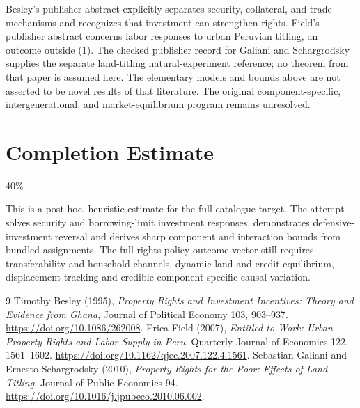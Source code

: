 \documentclass[11pt]{article}
\begin{document}
Besley's publisher abstract explicitly separates security, collateral,
and trade mechanisms and recognizes that investment can strengthen rights.
Field's publisher abstract concerns labor responses to urban Peruvian
titling, an outcome outside (1). The checked publisher record for Galiani
and Schargrodsky supplies the separate land-titling natural-experiment
reference; no theorem from that paper is assumed here. The elementary
models and bounds above are not asserted to be novel results of that
literature. The original component-specific, intergenerational, and
market-equilibrium program remains unresolved.

\section{Completion Estimate}
40\%

This is a post hoc, heuristic estimate for the full catalogue target.
The attempt solves security and borrowing-limit investment responses, demonstrates defensive-investment reversal and derives sharp component and interaction bounds from bundled assignments. The full rights-policy outcome vector still requires transferability and household channels, dynamic land and credit equilibrium, displacement tracking and credible component-specific causal variation.

\begin{thebibliography}{9}
 Timothy Besley (1995), \emph{Property Rights and Investment
Incentives: Theory and Evidence from Ghana}, Journal of Political Economy
103, 903--937. \url{https://doi.org/10.1086/262008}.
 Erica Field (2007), \emph{Entitled to Work: Urban Property
Rights and Labor Supply in Peru}, Quarterly Journal of Economics 122,
1561--1602. \url{https://doi.org/10.1162/qjec.2007.122.4.1561}.
 Sebastian Galiani and Ernesto Schargrodsky (2010),
\emph{Property Rights for the Poor: Effects of Land Titling},
Journal of Public Economics 94.
\url{https://doi.org/10.1016/j.jpubeco.2010.06.002}.
\end{thebibliography}
\end{document}
